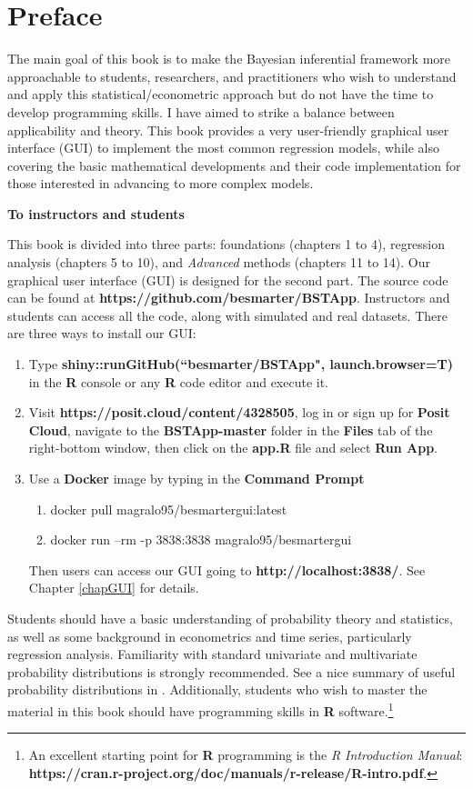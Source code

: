 \chapter*{Preface}
The main goal of this book is to make the Bayesian inferential framework more approachable to students, researchers, and practitioners who wish to understand and apply this statistical/econometric approach but do not have the time to develop programming skills. I have aimed to strike a balance between applicability and theory. This book provides a very user-friendly graphical user interface (GUI) to implement the most common regression models, while also covering the basic mathematical developments and their code implementation for those interested in advancing to more complex models.

\textbf{To instructors and students}

This book is divided into three parts: foundations (chapters 1 to 4), regression analysis (chapters 5 to 10), and \textit{Advanced} methods (chapters 11 to 14). Our graphical user interface (GUI) is designed for the second part. The source code can be found at \textbf{https://github.com/besmarter/BSTApp}. Instructors and students can access all the code, along with simulated and real datasets. There are three ways to install our GUI:

\begin{enumerate}
	\item Type \textbf{shiny::runGitHub(``besmarter/BSTApp", launch.browser=T)} in the \textbf{R} console or any \textbf{R} code editor and execute it.
	\item Visit \textbf{https://posit.cloud/content/4328505}, log in or sign up for \textbf{Posit Cloud}, navigate to the \textbf{BSTApp-master} folder in the \textbf{Files} tab of the right-bottom window, then click on the \textbf{app.R} file and select \textbf{Run App}.
	\item Use a \textbf{Docker} image by typing in the \textbf{Command Prompt}
	\begin{enumerate}
		\item docker pull magralo95/besmartergui:latest
		\item docker run --rm -p 3838:3838 magralo95/besmartergui
	\end{enumerate}
	Then users can access our GUI going to \textbf{http://localhost:3838/}. See Chapter \ref{chapGUI} for details.
\end{enumerate}

Students should have a basic understanding of probability theory and statistics, as well as some background in econometrics and time series, particularly regression analysis. Familiarity with standard univariate and multivariate probability distributions is strongly recommended. See a nice summary of useful probability distributions in \cite[p.~182-191]{greenberg2012introduction}. Additionally, students who wish to master the material in this book should have programming skills in \textbf{R} software.\footnote{An excellent starting point for \textbf{R} programming is the \textit{R Introduction Manual}: \textbf{https://cran.r-project.org/doc/manuals/r-release/R-intro.pdf}.}


